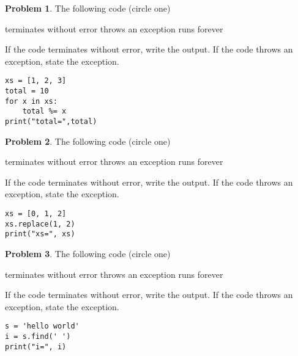 \documentclass[10pt]{article}
\theoremstyle{definition}
\newtheorem{problem}{Problem}
\begin{document}
\begin{problem}
    The following code (circle one)

    \vspace{0.25in}
    \hspace{0.5in}terminates without error 
    \hspace{1in}throws an exception
    \hspace{1in}runs forever
    \vspace{0.25in}

    \noindent
    If the code terminates without error, write the output.
    If the code throws an exception, state the exception.
\end{problem}
\begin{lstlisting}
xs = [1, 2, 3]
total = 10
for x in xs:
    total %= x
print("total=",total)
\end{lstlisting}
\vspace{1in}

\begin{problem}
    The following code (circle one)

    \vspace{0.25in}
    \hspace{0.5in}terminates without error 
    \hspace{1in}throws an exception
    \hspace{1in}runs forever
    \vspace{0.25in}

    \noindent
    If the code terminates without error, write the output.
    If the code throws an exception, state the exception.
\end{problem}
\begin{lstlisting}
xs = [0, 1, 2]
xs.replace(1, 2)
print("xs=", xs)
\end{lstlisting}
\vspace{1in}


\begin{problem}
    The following code (circle one)

    \vspace{0.25in}
    \hspace{0.5in}terminates without error 
    \hspace{1in}throws an exception
    \hspace{1in}runs forever
    \vspace{0.25in}

    \noindent
    If the code terminates without error, write the output.
    If the code throws an exception, state the exception.
\end{problem}
\begin{lstlisting}
s = 'hello world'
i = s.find(' ')
print("i=", i)
\end{lstlisting}
\vspace{1in}
\end{document}
